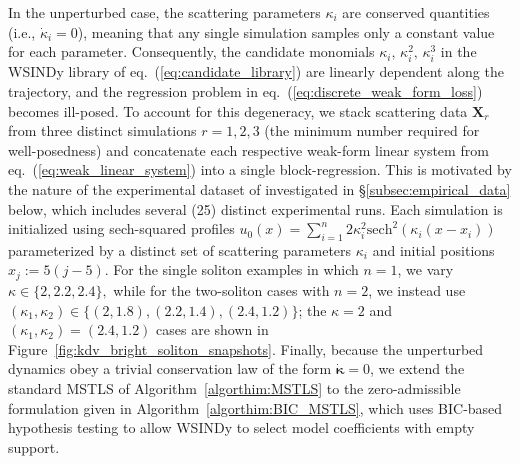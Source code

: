 \documentclass[journal=gmj]{CUP-JNL-DTM}%
\theoremstyle{definition}
\numberwithin{equation}{section}
\begin{document}
In the unperturbed case, the scattering parameters $\kappa_i$ are conserved quantities (i.e., $\dot{\kappa}_i = 0$), meaning that any single simulation samples only a constant value for each parameter. Consequently, the candidate monomials $\kappa_i,\, \kappa_i^2,\, \kappa_i^3$ in the WSINDy library of eq.~(\ref{eq:candidate_library}) are linearly dependent along the trajectory, and the regression problem in eq.~(\ref{eq:discrete_weak_form_loss}) becomes ill-posed. To account for this degeneracy, we stack scattering data $\mathbf{X}_r$ from three distinct simulations $r = 1,2,3$ (the minimum number required for well-posedness) and concatenate each respective weak-form linear system from eq.~(\ref{eq:weak_linear_system}) into a single block-regression. This is motivated by the nature of the experimental dataset of \cite{Heinrich.etal2025} investigated in \S\ref{subsec:empirical_data} below, which includes several (25) distinct experimental runs. Each simulation is initialized using sech-squared profiles $u_0(x) = \sum_{i=1}^{n} 2\kappa^2_i\text{sech}^2(\kappa_i(x - x_i))$ parameterized by a distinct set of scattering parameters $\kappa_i$ and initial positions $x_j := 5(j - 5)$. For the single soliton examples in which $n=1$, we vary $\kappa \in \{2, 2.2, 2.4\},$ while for the two-soliton cases with $n=2$, we instead use $(\kappa_1,\kappa_2) \in \{(2, 1.8), (2.2, 1.4), (2.4, 1.2)\}$; the $\kappa = 2$ and $(\kappa_1,\kappa_2) = (2.4, 1.2)$ cases are shown in Figure~\ref{fig:kdv_bright_soliton_snapshots}. Finally, because the unperturbed dynamics obey a trivial conservation law of the form $\dot{\boldsymbol{\kappa}} = 0$, we extend the standard MSTLS of Algorithm~\ref{algorthim:MSTLS} to the zero-admissible formulation given in Algorithm~\ref{algorthim:BIC_MSTLS}, which uses BIC-based hypothesis testing to allow WSINDy to select model coefficients with empty support.

\smallskip
\end{document}
